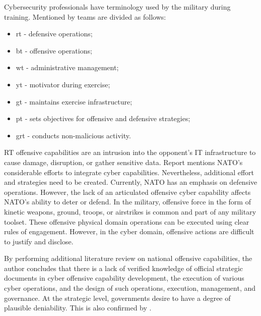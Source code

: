 Cybersecurity professionals have terminology used by the military during training. Mentioned by \citeauthor{30-rewiev-of-all-testbeds2020} \parencite{30-rewiev-of-all-testbeds2020} teams are divided as follows: 

\begin{itemize}
	\item \gls*{rt} - defensive operations;
	\item \gls*{bt} - offensive operations;
	\item\gls*{wt} - administrative management;
	\item \gls*{yt}  - motivator during exercise;
	\item \gls*{gt} - maintains exercise infrastructure;
	\item \gls*{pt} -  sets objectives for offensive and defensive strategies;
	\item \gls*{grt} - conducts non-malicious activity.
	
\end{itemize}

RT offensive capabilities are an intrusion into the opponent's IT infrastructure to cause damage, disruption, or gather sensitive data. Report  \parencite{53-NATO-role-of-offensi-cyber-capabilities} mentions NATO's considerable efforts to integrate cyber capabilities. Nevertheless, additional effort and strategies need to be created. Currently, NATO has an emphasis on defensive operations. However, the lack of an articulated offensive cyber capability affects NATO's ability to deter or defend. In the military, offensive force in the form of kinetic weapons, ground, troops, or airstrikes is common and part of any military toolset. These offensive physical domain operations can be executed using clear rules of engagement. However, in the cyber domain, offensive actions are difficult to justify and disclose.

By performing additional literature review on national offensive capabilities, the author concludes that there is a lack of verified knowledge of official strategic documents in cyber offensive capability development, the execution of various cyber operations, and the design of such operations, execution, management, and governance. At the strategic level, governments desire to have a degree of plausible deniability. This is also confirmed by \citeauthor{70-tackling-dod-cyber-red-team-deficiencies-systems-engineering} \parencite{70-tackling-dod-cyber-red-team-deficiencies-systems-engineering}.

